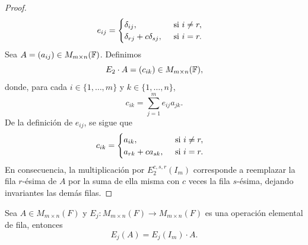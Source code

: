 \documentclass[12pt,a4paper]{book}
\begin{document}
\begin{proof}
\begin{equation*}
            e_{ij}=
            \begin{cases}
                \delta_{ij},\hfill\text{ si }i\neq r,\\
                \delta_{rj}+c\delta_{sj},\quad\text{ si }i=r.
            \end{cases}
        \end{equation*}
        Sea $A=(a_{ij})\in M_{m\times n}(\mathbb{F})$. Definimos
        \begin{equation*}
            E_{2}\cdot A=(c_{ik})\in M_{m\times n}(\mathbb{F}),
        \end{equation*}
        donde, para cada $i\in\{1,\dots,m\}$ y $k\in\{1,\dots,n\}$,
        \begin{equation*}
            c_{ik}=\sum_{j=1}^{m}e_{ij}a_{jk}.
        \end{equation*}
        De la definición de $e_{ij}$, se sigue que
        \begin{equation*}
            c_{ik}=
            \begin{cases}
                a_{ik},\hfill\text{ si }i\neq r,\\
                a_{rk}+ca_{sk},\quad\text{ si }i=r.
            \end{cases}
        \end{equation*}
        En consecuencia, la multiplicación por $E_{2}^{c,s,r}(I_{m})$ corresponde a reemplazar la fila $r$-ésima de $A$ por la suma de ella misma con $c$ veces la fila $s$-ésima, dejando
        invariantes las demás filas.
    \end{proof}

    \vspace{1cm}

    \begin{proposicion}
    \label{prop:8}
        Sea $A\in M_{m\times n}(F)$ y $E_{j}:M_{m\times n}(F)\to M_{m\times n}(F)$ es
        una operación elemental de fila, entonces
        \begin{equation*}
            E_{j}(A)=E_{j}(I_{m})\cdot A.
        \end{equation*}
    \end{proposicion}
\end{document}
